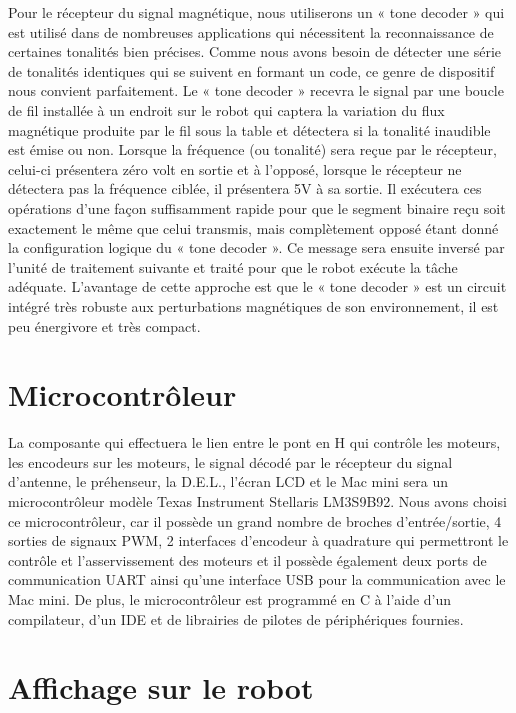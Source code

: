 Pour le récepteur du signal magnétique, nous utiliserons un « tone decoder » qui est utilisé dans de nombreuses applications qui nécessitent la reconnaissance de certaines tonalités bien précises. Comme nous avons besoin de détecter une série de tonalités identiques qui se suivent en formant un code, ce genre de dispositif nous convient parfaitement. Le « tone decoder » recevra le signal par une boucle de fil installée à un endroit sur le robot qui captera la variation du flux magnétique produite par le fil sous la table et détectera si la tonalité inaudible est émise ou non. Lorsque la fréquence (ou tonalité) sera reçue par le récepteur, celui-ci présentera zéro volt en sortie et à l’opposé, lorsque le récepteur ne détectera pas la fréquence ciblée, il présentera 5V à sa sortie. Il exécutera ces opérations d’une façon suffisamment rapide pour que le segment binaire reçu soit exactement le même que celui transmis, mais complètement opposé étant donné la configuration logique du « tone decoder ».  Ce message sera ensuite inversé par l’unité de traitement suivante et traité pour que le robot exécute la tâche adéquate. L’avantage de cette approche est que le « tone decoder » est un circuit intégré très robuste aux perturbations magnétiques de son environnement, il est peu énergivore et très compact.

\section{Microcontrôleur} \label{s:micro}

La composante qui effectuera le lien entre le pont en H qui contrôle les moteurs, les encodeurs sur les moteurs, le signal décodé par le récepteur du signal d'antenne, le préhenseur, la D.E.L., l'écran LCD et le Mac mini sera un microcontrôleur modèle Texas Instrument Stellaris LM3S9B92. Nous avons choisi ce microcontrôleur, car il possède un grand nombre de broches d'entrée/sortie, 4 sorties de signaux PWM, 2 interfaces d'encodeur à quadrature qui permettront le contrôle et l'asservissement des moteurs et il possède également deux ports de communication UART ainsi qu'une interface USB pour la communication avec le Mac mini. De plus, le microcontrôleur est programmé en C à l'aide d'un compilateur, d'un IDE et de librairies de pilotes de périphériques fournies.   

\section{Affichage sur le robot} \label{s:LCD}

